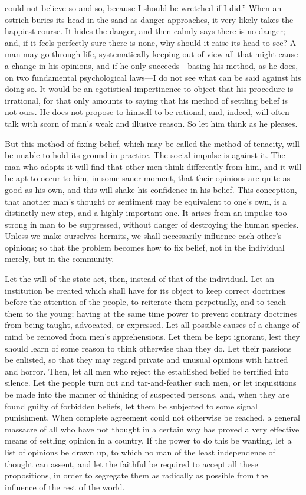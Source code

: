 could not believe so-and-so, because I should be wretched if I did.''
When an ostrich buries its head in the sand as danger approaches, it
very likely takes the happiest course. It hides the danger, and then
calmly says there is no danger; and, if it feels perfectly sure there
is none, why should it raise its head to see? A man may go through
life, systematically keeping out of view all that might cause a change
in his opinions, and if he only suc\-ceeds---basing his method, as he
does, on two fundamental psychological laws---I do not see what can be
said against his doing so. It would be an egotistical impertinence to
object that his procedure is irrational, for that only amounts to
saying that his method of settling belief is not ours. He does not
propose to himself to be rational, and, indeed, will often talk with
scorn of man's weak and illusive reason. So let him think as he
pleases.

But this method of fixing belief, which may be called the method of
tenacity, will be unable to hold its ground in practice. The social
impulse is against it. The man who adopts it will find that other men
think differently from him, and it will be apt to occur to him, in
some saner moment, that their opinions are quite as good as his own,
and this will shake his confidence in his belief. This conception,
that another man's thought or sentiment may be equivalent to one's
own, is a distinctly new step, and a highly important one. It arises
from an impulse too strong in man to be suppressed, without danger of
destroying the human species. Unless we make ourselves hermits, we
shall necessarily influence each other's opinions; so that the problem
becomes how to fix belief, not in the individual merely, but in the
community.

Let the will of the state act, then, instead of that of the
individual. Let an institution be created which shall have for its
object to keep correct doctrines before the attention of the people,
to reiterate them perpetually, and to teach them to the young; having
at the same time power to prevent contrary doctrines from being
taught, advocated, or expressed. Let all possible causes of a change
of mind be removed from men's apprehensions. Let them be kept
ignorant, lest they should learn of some reason to think otherwise
than they do. Let their passions be enlisted, so that they may regard
private and unusual opinions with hatred and horror. Then, let all men
who reject the established belief be terrified into silence. Let the
people turn out and tar-and-feather such men, or let inquisitions be
made into the manner of thinking of suspected persons, and, when they
are found guilty of forbidden beliefs, let them be subjected to some
signal punishment. When complete agreement could not otherwise be
reached, a general massacre of all who have not thought in a certain
way has proved a very effective means of settling opinion in a
country. If the power to do this be wanting, let a list of opinions be
drawn up, to which no man of the least independence of thought can
 assent, and let the faithful be required to accept all these
propositions, in order to segregate them as radically as possible from
the influence of the rest of the world.

